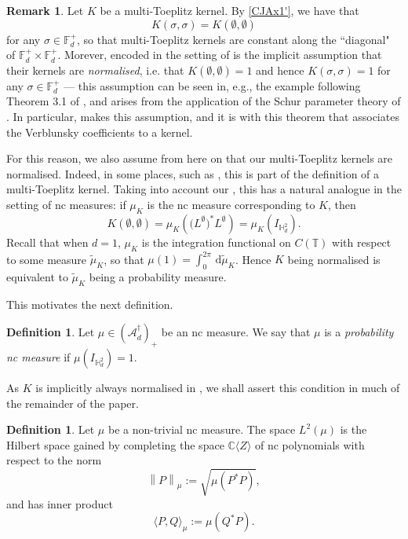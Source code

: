 \documentclass[11pt,reqno]{amsart}
\newcommand\norm[1]{\left\lVert#1\right\rVert}
\newcommand\ncm[1]{(\mathscr{A}_{#1}^{\dagger})_+}
\def\s{\sigma}
\def\rmd{\mathrm{d}}
\def\CC{\mathbb{C}}
\def\TT{\mathbb{T}}
\def\FF{\mathbb{F}}
\def\HH{\mathbb{H}}
\theoremstyle{definition}
\newtheorem{definition}[theorem]{Definition}
\newtheorem{remark}[theorem]{Remark}
\numberwithin{equation}{section}
\renewcommand{\tilde}{\widetilde}
\begin{document}
\begin{remark}
    Let \(K\) be a multi-Toeplitz kernel. By \eqref{CJAx1'}, we have that
    \[
        K(\s, \s) = K(\emptyset, \emptyset)
    \]
    for any \(\s \in \FF_d^+\), so that multi-Toeplitz kernels are constant along the ``diagonal" of \(\FF_d^+ \times \FF_d^+\). Morever, encoded in the setting of \cite{CJ02b} is the implicit assumption that their kernels are \emph{normalised}, i.e. that \(K(\emptyset, \emptyset) = 1\) and hence \(K(\s, \s) = 1\) for any \(\s \in \FF_d^+\) --- this assumption can be seen in, e.g., the example following Theorem 3.1 of \cite{CJ02b}, and arises from the application of the Schur parameter theory of \cite{Con96}. In particular, \cite[Theorem 1.5.3]{Con96} makes this assumption, and it is with this theorem that \cite{CJ02b} associates the Verblunsky coefficients to a kernel.

    For this reason, we also assume from here on that our multi-Toeplitz kernels are normalised. Indeed, in some places, such as \cite{Pop01}, this is part of the definition of a multi-Toeplitz kernel. Taking into account our , this has a natural analogue in the setting of nc measures: if \(\mu_K\) is the nc measure corresponding to \(K\), then
    \[
        K(\emptyset, \emptyset) = \mu_K\left(\big(L^{\emptyset}\big)^* L^{\emptyset}\right) = \mu_K(I_{\HH^2_d}).
    \]
    Recall that when \(d = 1\), \(\mu_K\) is the integration functional on \(C(\TT)\) with respect to some measure \(\tilde{\mu}_K\), so that \(\mu(1) = \int_0^{2\pi} \, \rmd \tilde{\mu}_K\). Hence \(K\) being normalised is equivalent to \(\tilde{\mu}_K\) being a probability measure. 
\end{remark}

This motivates the next definition.

\begin{definition}
    Let \(\mu \in \ncm{d}\) be an nc measure. We say that \(\mu\) is a \emph{probability nc measure} if \(\mu(I_{\HH^2_d}) = 1\).
\end{definition}

As \(K\) is implicitly always normalised in \cite{CJ02b}, we shall assert this condition in much of the remainder of the paper.

\begin{definition}
    Let \(\mu\) be a non-trivial nc measure. The space \(L^2(\mu)\) is the Hilbert space gained by completing the space \(\CC\langle Z \rangle\) of nc polynomials with respect to the norm
    \[
        \norm{P}_\mu := \sqrt{\mu(P^*P)},
    \]
    and has inner product
    \[
        \langle P, Q \rangle_\mu := \mu(Q^* P).
    \]
\end{definition}
\end{document}
